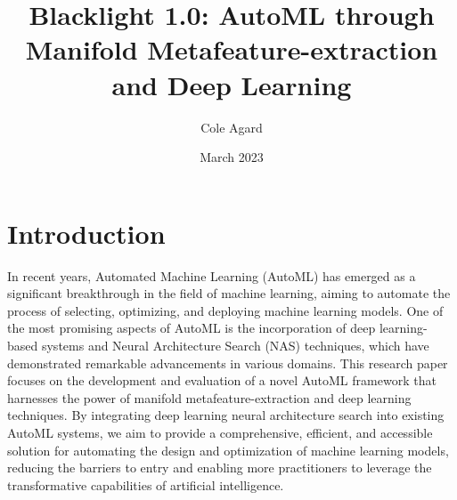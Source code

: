 \documentclass{article}
\title{Blacklight 1.0: AutoML through Manifold Metafeature-extraction and Deep Learning}
\author{Cole Agard}
\date{March 2023}
\begin{document}
\maketitle

\section{Introduction}
In recent years, Automated Machine Learning (AutoML) has emerged as a significant breakthrough in the field of machine learning, aiming to automate the process of selecting, optimizing, and deploying machine learning models. One of the most promising aspects of AutoML is the incorporation of deep learning-based systems and Neural Architecture Search (NAS) techniques, which have demonstrated remarkable advancements in various domains. This research paper focuses on the development and evaluation of a novel AutoML framework that harnesses the power of manifold metafeature-extraction and deep learning techniques. By integrating deep learning neural architecture search into existing AutoML systems, we aim to provide a comprehensive, efficient, and accessible solution for automating the design and optimization of machine learning models, reducing the barriers to entry and enabling more practitioners to leverage the transformative capabilities of artificial intelligence.
\newpage
\end{document}
